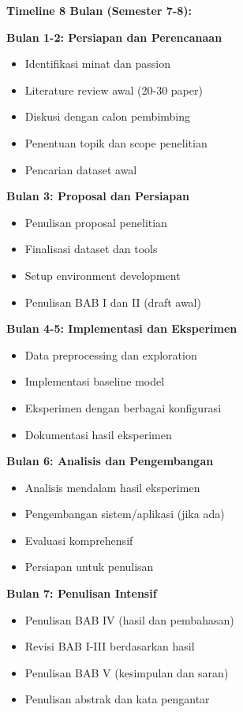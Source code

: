 \textbf{Timeline 8 Bulan (Semester 7-8):}

\textbf{Bulan 1-2: Persiapan dan Perencanaan}
\begin{itemize}
    \item Identifikasi minat dan passion
    \item Literature review awal (20-30 paper)
    \item Diskusi dengan calon pembimbing
    \item Penentuan topik dan scope penelitian
    \item Pencarian dataset awal
\end{itemize}

\textbf{Bulan 3: Proposal dan Persiapan}
\begin{itemize}
    \item Penulisan proposal penelitian
    \item Finalisasi dataset dan tools
    \item Setup environment development
    \item Penulisan BAB I dan II (draft awal)
\end{itemize}

\textbf{Bulan 4-5: Implementasi dan Eksperimen}
\begin{itemize}
    \item Data preprocessing dan exploration
    \item Implementasi baseline model
    \item Eksperimen dengan berbagai konfigurasi
    \item Dokumentasi hasil eksperimen
\end{itemize}

\textbf{Bulan 6: Analisis dan Pengembangan}
\begin{itemize}
    \item Analisis mendalam hasil eksperimen
    \item Pengembangan sistem/aplikasi (jika ada)
    \item Evaluasi komprehensif
    \item Persiapan untuk penulisan
\end{itemize}

\textbf{Bulan 7: Penulisan Intensif}
\begin{itemize}
    \item Penulisan BAB IV (hasil dan pembahasan)
    \item Revisi BAB I-III berdasarkan hasil
    \item Penulisan BAB V (kesimpulan dan saran)
    \item Penulisan abstrak dan kata pengantar
\end{itemize}

